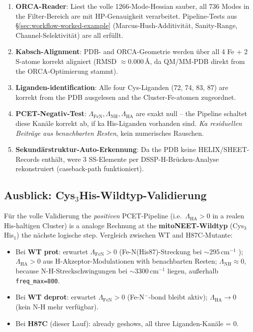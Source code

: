 \documentclass[11pt,a4paper,twoside]{article}
\providecommand{\angstrom}{\text{\AA}}    %
\theoremstyle{remark}
\begin{document}
\begin{enumerate}
  \item \textbf{ORCA-Reader}: Liest the volle 1266-Mode-Hessian
        sauber, all 736 Modes in the Filter-Bereich are mit
        HP-Genauigkeit verarbeitet. Pipeline-Tests aus
        \S\ref{sec:workflow-worked-example} (Marcus-Hush-Additivit\"at,
        Sanity-Range, Channel-Selektivit\"at) are all erf\"ullt.
  \item \textbf{Kabsch-Alignment}: PDB- and ORCA-Geometrie werden
        \"uber all 4 Fe + 2 S-atome korrekt aligniert (RMSD
        $\approx 0.000$\,$\angstrom$, da QM/MM-PDB direkt from the
        ORCA-Optimierung stammt).
  \item \textbf{Liganden-identification}: Alle four Cys-Liganden
        (72, 74, 83, 87) are korrekt from the PDB ausgelesen
        and the Cluster-Fe-atomen zugeordnet.
  \item \textbf{PCET-Negativ-Test}: $\Lambda_\text{FeN}, \Lambda_\text{NH},
        \Lambda_\text{HA}$ are exakt null -- the Pipeline schaltet
        diese Kan\"ale korrekt ab, if ka His-Liganden vorhanden
        sind. \emph{Ka residuellen Beitr\"age aus benachbarten
        Resten}, kein numerisches Rauschen.
  \item \textbf{Sekund\"arstruktur-Auto-Erkennung}: Da the PDB keine
        HELIX/SHEET-Records enth\"alt, were 3 SS-Elemente per
        DSSP-H-Br\"ucken-Analyse rekonstruiert (caseback-path
        funktioniert).
\end{enumerate}

\subsection{Ausblick: Cys$_3$His-Wildtyp-Validierung}
\label{sec:val-cys3his-wt}

F\"ur the volle Validierung the \emph{positiven} PCET-Pipeline
(i.e.\ $\Lambda_\text{HA} > 0$ in a realen His-haltigen Cluster)
is a analoge Rechnung at the \textbf{mitoNEET-Wildtyp}
(Cys$_3$His$_1$) the n\"achste logische step. Vergleich
zwischen WT and H87C-Mutante:

\begin{itemize}\setlength{\itemsep}{0pt}
  \item Bei \textbf{WT prot}: erwartet $\Lambda_\text{FeN} > 0$
        (Fe-N(His87)-Streckung bei $\sim 295$\,cm$^{-1}$
        \cite{Gee2021}); $\Lambda_\text{HA} > 0$ aus
        H-Akzeptor-Modulationen with benachbarten Resten;
        $\Lambda_\text{NH} \approx 0$, because N-H-Streckschwingungen
        bei $\sim 3300$\,cm$^{-1}$ liegen, au{\ss}erhalb
        \texttt{freq\_max=800}.
  \item Bei \textbf{WT deprot}: erwartet $\Lambda_\text{FeN} > 0$
        (Fe-N$^-$-bond bleibt aktiv); $\Lambda_\text{HA} \to 0$
        (kein N-H mehr verf\"ugbar).
  \item Bei \textbf{H87C} (dieser Lauf): already geshows, all three
        Liganden-Kan\"ale = 0.
\end{itemize}
\end{document}
